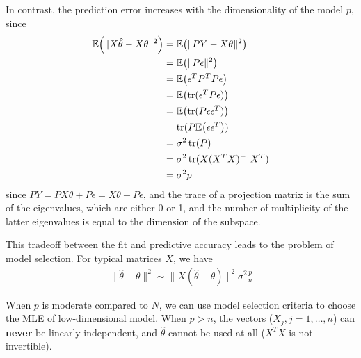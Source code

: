 In contrast, the prediction error increases with the dimensionality of
the model $p$, since
\begin{align}
  \label{eq:100}
  \E{\| X \hat \theta - X \theta \|^{2}} &= \E{\| PY - X \theta
    \|^{2}} \\
  &= \E{ \| P\epsilon \|^{2}} \\
  &= \E{\epsilon^{T} P^{T} P \epsilon} \\
  &= \E{\tr(\epsilon^{T}P\epsilon)} \\
  &= \E{\tr(P \epsilon \epsilon^{T})} \\
  &= \tr(P \E{\epsilon \epsilon^{T}}) \\
  &= \sigma^{2} \tr(P) \\
  &= \sigma^{2} \tr(X (X^{T} X)^{-1} X^{T}) \\
  &= \sigma^{2} p
\end{align} since $PY = PX\theta + P \epsilon = X \theta + P\epsilon$,
and the trace of a projection matrix is the sum of the eigenvalues,
which are either 0 or 1, and the number of multiplicity of the latter
eigenvalues is equal to the dimension of the subspace.

This tradeoff between the fit and predictive accuracy leads to the
problem of model selection.  For typical matrices $X$, we have
\begin{align}
  \label{eq:100}
  \| \hat \theta - \theta \|^{2} \sim \| X(\hat \theta - \theta)
  \|^{2} \sigma^{2} \frac{p}{n}
\end{align}

When $p$ is moderate compared to $N$, we can use model selection
criteria to choose the MLE of low-dimensional model.  When $p > n$,
the vectors ($X_{j}, j =1, \dots, n$) can \textbf{never} be linearly
independent, and $\hat \theta$ cannot be used at all ($X^{T} X$ is not
invertible).

